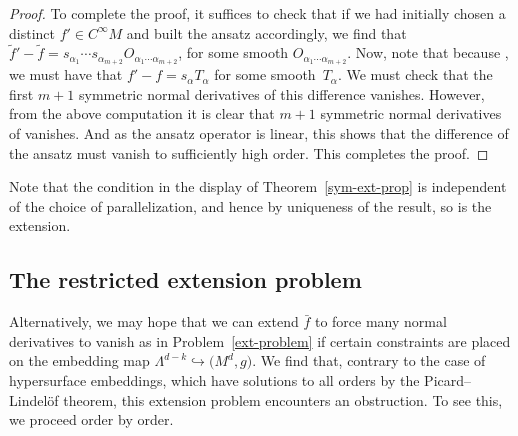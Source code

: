 \documentclass[pdftex]{sigma}
\numberwithin{equation}{section}
\renewcommand{\=}{\stackrel \Lambda =}
\begin{document}
\begin{proof}
To complete the proof, it suffices to check that if we had initially chosen a distinct ${f' \in C^\infty M}$ and built the ansatz accordingly, we find that $\tilde{f}'-\tilde{f} = s_{\alpha_1} \cdots s_{\alpha_{m+2}} O_{\alpha_1 \cdots \alpha_{m+2}}$, for some smooth $O_{\alpha_1 \cdots \alpha_{m+2}}$. Now, note that because \smash{$f'|_{\Lambda} \= \bar{f}$}, we must have that $f' - f = s_{\alpha} T_{\alpha}$ for some smooth~$T_{\alpha}$. We must check that the first $m+1$ symmetric normal derivatives of this difference vanishes. However, from the above computation it is clear that $m+1$ symmetric normal deri\-vatives of  vanishes. And as the ansatz operator is linear, this shows that the difference of the ansatz must vanish to sufficiently high order. This completes the proof.
\end{proof}

\begin{Remark}
Note that the condition in the display of Theorem~\ref{sym-ext-prop} is independent of the choice of parallelization, and hence by uniqueness of the result, so is the extension.
\end{Remark}





\subsection{The restricted extension problem}

Alternatively, we may hope that we can extend $\bar{f}$ to force many normal derivatives to vanish as in Problem~\ref{ext-problem} if certain constraints are placed on the embedding map $\Lambda^{d-k} \hookrightarrow \bigl(M^d,g\bigr)$.
We find that, contrary to the case of hypersurface embeddings, which have solutions to all orders by the Picard--Lindel{\"o}f theorem, this extension problem encounters an obstruction. To see this, we proceed order by order.
\end{document}

